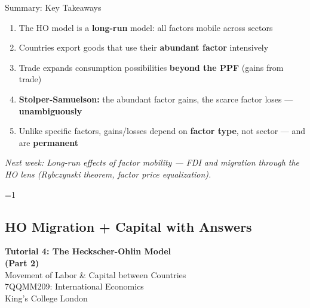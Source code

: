 \documentclass{beamer}
\newcommand{\showanswers}{1}  %
\begin{document}
\begin{frame}{Summary: Key Takeaways}

\begin{enumerate}
    \item The HO model is a \textbf{long-run} model: all factors mobile across sectors
    
    \vspace{0.2cm}
    
    \item Countries export goods that use their \textbf{abundant factor} intensively
    
    \vspace{0.2cm}
    
    \item Trade expands consumption possibilities \textbf{beyond the PPF} (gains from trade)
    
    \vspace{0.2cm}
    
    \item \textbf{Stolper-Samuelson:} the abundant factor gains, the scarce factor loses --- \textbf{unambiguously}
    
    \vspace{0.2cm}
    
    \item Unlike specific factors, gains/losses depend on \textbf{factor type}, not sector --- and are \textbf{permanent}
\end{enumerate}

\vspace{0.3cm}

\textit{Next week: Long-run effects of factor mobility --- FDI and migration through the HO lens (Rybczynski theorem, factor price equalization).}

\end{frame}


\fi


\ifnum\showanswers=1
\subsection{HO Migration + Capital with Answers}


\begin{frame}

\vspace{1.5cm}

\centering
{\Large \textbf{Tutorial 4: The Heckscher-Ohlin Model \\ (Part 2)}} \\[0.5cm]
{\large Movement of Labor \& Capital between Countries} \\[1.0cm]

{\small 7QQMM209: International Economics} \\[0.3cm]
{\small King's College London}

\vfill

\end{frame}
\end{document}
